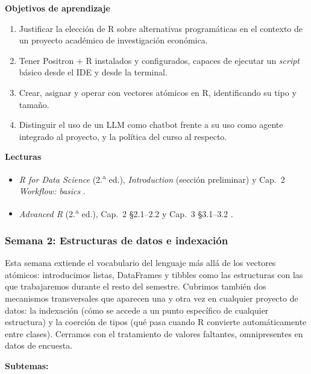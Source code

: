 \documentclass[11pt,letterpaper]{article}
\newcommand{\blue}[1]{{\color{cerulean}#1}}
\newcommand{\orange}[1]{{\color{redorange}#1}}
\newcommand{\semana}[2]{%
  \subsubsection*{\color{main}Semana #1: #2}%
}
\begin{document}
\medskip
\noindent\textbf{Objetivos de aprendizaje}
\begin{enumerate}[leftmargin=*, itemsep=1pt]
    \item Justificar la elección de R sobre alternativas programáticas en el contexto de un proyecto académico de investigación económica.
    \item Tener Positron + R instalados y configurados, capaces de ejecutar un \textit{script} básico desde el IDE y desde la terminal.
    \item Crear, asignar y operar con vectores atómicos en R, identificando su tipo y tamaño.
    \item Distinguir el uso de un LLM como chatbot frente a su uso como agente integrado al proyecto, y la política del curso al respecto.
\end{enumerate}

\medskip
\noindent\textbf{Lecturas}
\begin{itemize}[leftmargin=*, itemsep=1pt]
    \item \textit{R for Data Science} (2.\textsuperscript{a} ed.), \textit{Introduction} (sección preliminar) y Cap.\ 2 \textit{Workflow: basics} \cite{wickham2023r4ds}.
    \item \textit{Advanced R} (2.\textsuperscript{a} ed.), Cap.\ 2 §2.1--2.2 y Cap.\ 3 §3.1--3.2 \cite{wickham2019advr}.
\end{itemize}

\semana{2}{Estructuras de datos e indexación}

Esta semana extiende el vocabulario del lenguaje más allá de los vectores atómicos: introducimos listas, DataFrames y tibbles como las estructuras con las que trabajaremos durante el resto del semestre. Cubrimos también dos mecanismos transversales que aparecen una y otra vez en cualquier proyecto de datos: la \blue{indexación} (cómo se accede a un punto específico de cualquier estructura) y la \blue{coerción de tipos} (qué pasa cuando R convierte automáticamente entre clases). Cerramos con el tratamiento de \orange{valores faltantes}, omnipresentes en datos de encuesta.

\textbf{Subtemas:}
\end{document}

